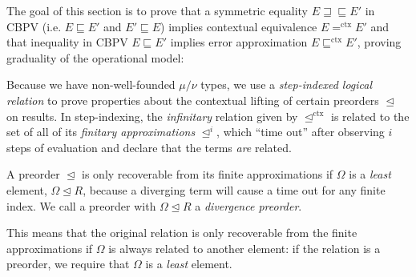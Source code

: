 \documentclass[acmsmall,nonacm]{acmart}
\newif\ifshort
\newcommand{\pipe}{\,\,|\,\,}
\newcommand{\ltdyn}{\sqsubseteq}
\newcommand{\gtdyn}{\sqsupseteq}
\newcommand{\equidyn}{\mathrel{\gtdyn\ltdyn}}
\newcommand{\apreorder}{\trianglelefteq}
\newcommand{\ctxize}[1]{\mathrel{{#1}^{\text{ctx}}}}
\newcommand{\ix}[2]{\mathrel{#1^{#2}}}
\newcommand{\diverge}{\Omega}
\begin{document}
{The goal of this section is to prove that a symmetric equality $E \equidyn
E'$ in CBPV (i.e. $E \ltdyn E'$ and $E' \ltdyn E$) implies contextual
equivalence $E \ctxize= E'$ and that inequality in CBPV $E \ltdyn E'$
implies error approximation $E \ctxize\ltdyn E'$, proving graduality of the operational model\ifshort .\else :\fi
\begin{longonly}
\begin{small}
\end{small}
\end{longonly}
Because we have non-well-founded $\mu/\nu$ types, we use a
\emph{step-indexed logical relation} to prove properties about the
contextual lifting of certain preorders $\apreorder$ on results.
%
In step-indexing, the \emph{infinitary} relation given by
$\ctxize\apreorder$ is related to the set of all of its \emph{finitary
  approximations} $\ix\apreorder i$, which ``time out'' after observing
$i$ steps of evaluation and declare that the
terms \emph{are} related.
%
\begin{shortonly}
  A preorder $\apreorder$ is only recoverable from its finite
  approximations if $\diverge$ is a \emph{least} element, $\diverge
  \apreorder R$, because a diverging term will cause a time out for
  any finite index. We call a preorder with $\diverge \apreorder R$ a
  \emph{divergence preorder}.~
\end{shortonly}
%
\begin{longonly}
This means that the original relation is only recoverable from the
finite approximations if $\diverge$ is always related to another
element: if the relation is a preorder, we require that $\diverge$ is
a \emph{least} element.


\end{longonly}}
\end{document}
